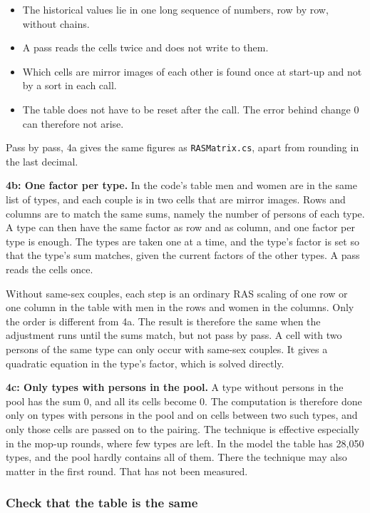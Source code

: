 \documentclass[12pt,a4paper]{article}
\newcommand{\kode}[1]{\texttt{#1}}
\begin{document}
\begin{itemize}
\item The historical values lie in one long sequence of numbers, row by row, without chains.
\item A pass reads the cells twice and does not write to them.
\item Which cells are mirror images of each other is found once at start-up and not by a sort in
each call.
\item The table does not have to be reset after the call. The error behind change 0 can therefore
not arise.
\end{itemize}

Pass by pass, 4a gives the same figures as \kode{RASMatrix.cs}, apart from rounding in the last
decimal.

\textbf{4b: One factor per type.} In the code's table men and women are in the same list of types,
and each couple is in two cells that are mirror images. Rows and columns are to match the same
sums, namely the number of persons of each type. A type can then have the same factor as row and as
column, and one factor per type is enough. The types are taken one at a time, and the type's factor
is set so that the type's sum matches, given the current factors of the other types. A pass reads
the cells once.

Without same-sex couples, each step is an ordinary RAS scaling of one row or one column in the
table with men in the rows and women in the columns. Only the order is different from 4a. The
result is therefore the same when the adjustment runs until the sums match, but not pass by pass. A
cell with two persons of the same type can only occur with same-sex couples. It gives a quadratic
equation in the type's factor, which is solved directly.

\textbf{4c: Only types with persons in the pool.} A type without persons in the pool has the sum 0,
and all its cells become 0. The computation is therefore done only on types with persons in the
pool and on cells between two such types, and only those cells are passed on to the pairing. The
technique is effective especially in the mop-up rounds, where few types are left. In the model the
table has 28,050 types, and the pool hardly contains all of them. There the technique may also
matter in the first round. That has not been measured.

\subsubsection*{Check that the table is the same}
\end{document}
